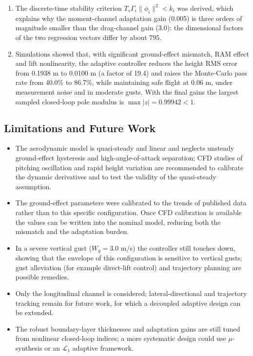 \documentclass[conference]{IEEEtran}
\begin{document}
\begin{enumerate}
  \item The discrete-time stability criterion $T_s\Gamma_i\|\phi_i\|^2 < k_i$ was derived, which explains why the moment-channel adaptation gain (0.005) is three orders of magnitude smaller than the drag-channel gain (3.0): the dimensional factors of the two regression vectors differ by about 795.
  \item Simulations showed that, with significant ground-effect mismatch, RAM effect and lift nonlinearity, the adaptive controller reduces the height RMS error from 0.1938 m to 0.0100 m (a factor of 19.4) and raises the Monte-Carlo pass rate from 40.0\% to 86.7\%, while maintaining safe flight at 0.06 m, under measurement noise and in moderate gusts. With the final gains the largest sampled closed-loop pole modulus is $\max|z| = 0.99942 < 1$.
\end{enumerate}

\subsection{Limitations and Future Work}
\begin{itemize}
  \item The aerodynamic model is quasi-steady and linear and neglects unsteady ground-effect hysteresis and high-angle-of-attack separation; CFD studies of pitching oscillation and rapid height variation are recommended to calibrate the dynamic derivatives and to test the validity of the quasi-steady assumption.
  \item The ground-effect parameters were calibrated to the trends of published data rather than to this specific configuration. Once CFD calibration is available the values can be written into the nominal model, reducing both the mismatch and the adaptation burden.
  \item In a severe vertical gust ($W_g = 3.0$ m/s) the controller still touches down, showing that the envelope of this configuration is sensitive to vertical gusts; gust alleviation (for example direct-lift control) and trajectory planning are possible remedies.
  \item Only the longitudinal channel is considered; lateral-directional and trajectory tracking remain for future work, for which a decoupled adaptive design can be extended.
  \item The robust boundary-layer thicknesses and adaptation gains are still tuned from nonlinear closed-loop indices; a more systematic design could use $\mu$-synthesis or an $\mathcal{L}_1$ adaptive framework.
\end{itemize}
\end{document}
